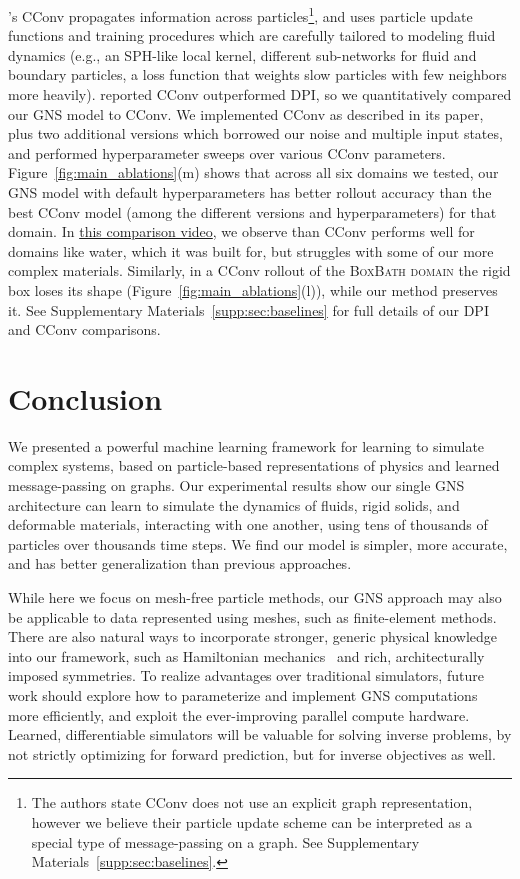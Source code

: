 \documentclass{article}
\newcommand\figref[1]{Figure~\ref{#1}}
\newcommand\domain[1]{\textsc{#1}}
\newcommand\vidcconv[1]{\href{http://tny.sh/6I0girh}{#1}}
\begin{document}
\citet{ummenhofer2020lagrangian}'s CConv propagates information across particles\footnote{The authors state CConv does not use an explicit graph representation, however we believe their particle update scheme can be interpreted as a special type of message-passing on a graph. See Supplementary Materials~\ref{supp:sec:baselines}.}, and uses particle update functions and training procedures which are carefully tailored to modeling fluid dynamics (e.g., an SPH-like local kernel, different sub-networks for fluid and boundary particles, a loss function that weights slow particles with few neighbors more heavily). 
%
%
\citet{ummenhofer2020lagrangian} reported CConv outperformed DPI, so we quantitatively compared our GNS model to CConv. 
%
We implemented CConv as described in its paper, plus two additional versions which borrowed our noise and multiple input states,
%
and performed hyperparameter sweeps over various CConv parameters. \figref{fig:main_ablations}(m) shows that across all six domains we tested, our GNS model with default hyperparameters has better rollout accuracy than the best CConv model (among the different versions and hyperparameters) for that domain. In \vidcconv{this comparison video}, we observe than CConv performs well for domains like water, which it was built for, but struggles with some of our more complex materials. Similarly, in a CConv rollout of the \domain{BoxBath domain} the rigid box loses its shape (\figref{fig:main_ablations}(l)), while our method preserves it. See Supplementary Materials~\ref{supp:sec:baselines} for full details of our DPI and CConv comparisons. 
 
%
\section{Conclusion}
\label{sec:conclusion}

We presented a powerful machine learning framework for learning to simulate complex systems, based on particle-based representations of physics and learned message-passing on graphs.
%
%
%
Our experimental results show our single GNS architecture can learn to simulate the dynamics of fluids, rigid solids, and deformable materials, interacting with one another, using tens of thousands of particles over thousands time steps. We find our model is simpler, more accurate, and has better generalization than previous approaches.

%

%
While here we focus on mesh-free particle methods, our GNS approach may also be applicable to data represented using meshes, such as finite-element methods. There are also natural ways to incorporate stronger, generic physical knowledge into our framework, such as Hamiltonian mechanics~\cite{sanchez2019hamiltonian} and rich, architecturally imposed symmetries. To realize advantages over traditional simulators, future work should explore how to parameterize and implement GNS computations more efficiently, and exploit the ever-improving parallel compute hardware. Learned, differentiable simulators will be valuable for solving inverse problems, by not strictly optimizing for forward prediction, but for inverse objectives as well.
\end{document}
